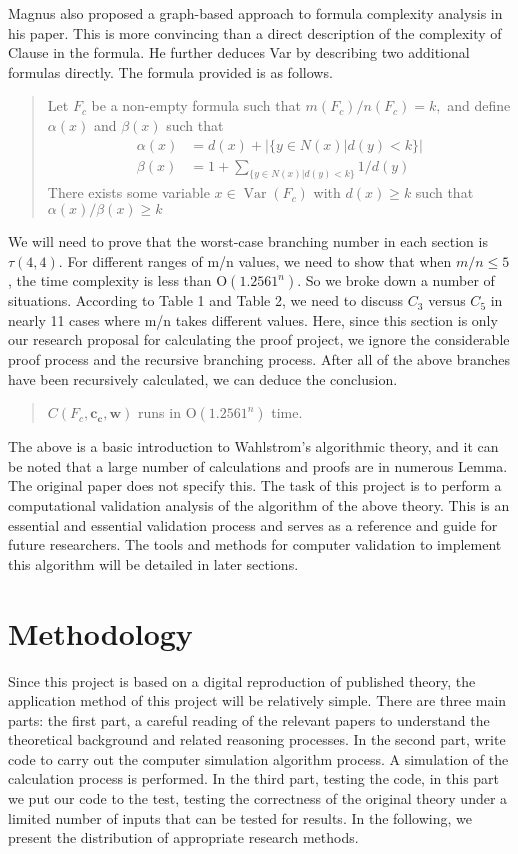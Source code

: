 \documentclass{sigchi}
\begin{document}
Magnus also proposed a graph-based approach to formula complexity analysis in his paper. This is more convincing than a direct description of the complexity of Clause in the formula. He further deduces Var by describing two additional formulas directly. The formula provided is as follows.
\begin{quote}
	Let $F_{c}$ be a non-empty formula such that $m(F_{c}) / n(F_{c})=k,$ and define $\alpha(x)$ and
	$\beta(x)$ such that
	$$
	\begin{aligned}
	\alpha(x) &=d(x)+|\{y \in N(x) | d(y)<k\}| \\
	\beta(x) &=1+\sum_{\{y \in N(x) | d(y)<k\}} 1 / d(y)
	\end{aligned}
	$$
	There exists some variable $x \in \operatorname{Var}(F_{c})$ with $d(x) \geqslant k$ such that $\alpha(x) / \beta(x) \geqslant k$
\end{quote}
We will need to prove that the worst-case branching number in each section is $\tau(4,4)$. For different ranges of m/n values, we need to show that when $m/n\leqslant5$, the time complexity is less than $\mathrm{O}\left(1.2561^{n}\right)$. So we broke down a number of situations. According to Table 1 and Table 2, we need to discuss $C_{3}$ versus $C_{5}$ in nearly 11 cases where m/n takes different values. Here, since this section is only our research proposal for calculating the proof project, we ignore the considerable proof process and the recursive branching process. After all of the above branches have been recursively calculated, we can deduce the conclusion.
\begin{quote}
	$C(F_{c}, \mathbf{c_{c}}, \mathbf{w})$ runs in $\mathrm{O}\left(1.2561^{n}\right)$ time.
\end{quote}
The above is a basic introduction to Wahlstrom's algorithmic theory, and it can be noted that a large number of calculations and proofs are in numerous Lemma. The original paper does not specify this. The task of this project is to perform a computational validation analysis of the algorithm of the above theory. This is an essential and essential validation process and serves as a reference and guide for future researchers. The tools and methods for computer validation to implement this algorithm will be detailed in later sections.

\section{Methodology}
Since this project is based on a digital reproduction of published theory, the application method of this project will be relatively simple. There are three main parts: the first part, a careful reading of the relevant papers to understand the theoretical background and related reasoning processes. In the second part, write code to carry out the computer simulation algorithm process. A simulation of the calculation process is performed. In the third part, testing the code, in this part we put our code to the test, testing the correctness of the original theory under a limited number of inputs that can be tested for results. In the following, we present the distribution of appropriate research methods.
\end{document}
